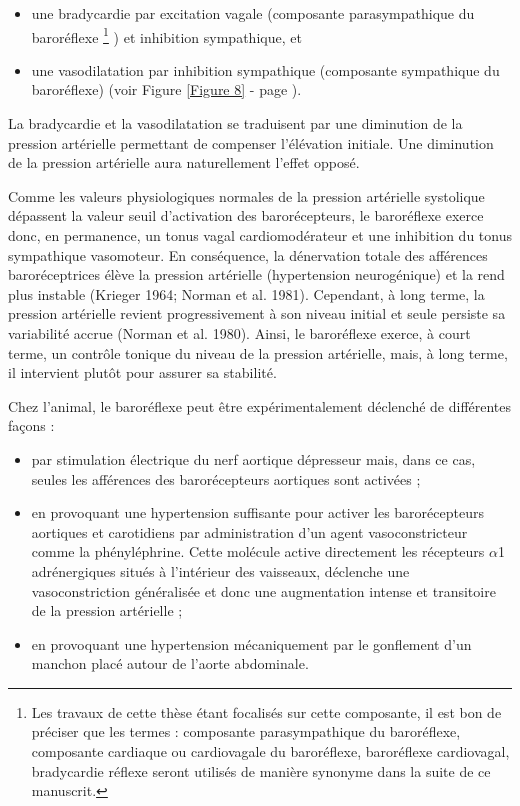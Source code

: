 \documentclass[a4paper,12pt,twoside]{report}
\begin{document}
\begin{itemize}
\item une bradycardie par excitation vagale (composante parasympathique du baroréflexe
\footnote{Les travaux de cette thèse étant focalisés sur cette composante, il est bon de préciser que les termes : composante parasympathique du baroréflexe, composante cardiaque ou cardiovagale du baroréflexe, baroréflexe cardiovagal, bradycardie réflexe seront utilisés de manière synonyme dans la suite de ce manuscrit.}
) et inhibition sympathique, et
\item une vasodilatation par inhibition sympathique (composante sympathique du baroréflexe) (voir Figure \ref{Figure 8} - page \pageref{Figure 8}).
\end{itemize}

La bradycardie et la vasodilatation se traduisent par une diminution de la pression artérielle permettant de compenser l’élévation initiale. Une diminution de la pression artérielle aura naturellement l'effet opposé. 

Comme les valeurs physiologiques normales de la pression artérielle systolique dépassent la valeur seuil d’activation des barorécepteurs, le baroréflexe exerce donc, en permanence, un tonus vagal cardiomodérateur et une inhibition du tonus sympathique vasomoteur. En conséquence, la dénervation totale des afférences baroréceptrices élève la pression artérielle (hypertension neurogénique) et la rend plus instable (Krieger 1964; Norman et al. 1981). Cependant, à long terme, la pression artérielle revient progressivement à son niveau initial et seule persiste sa variabilité accrue (Norman et al. 1980). Ainsi, le baroréflexe exerce, à court terme, un contrôle tonique du niveau de la pression artérielle, mais, à long terme, il intervient plutôt pour assurer sa stabilité.

Chez l’animal, le baroréflexe peut être expérimentalement déclenché de différentes façons : 

\begin{itemize}
\item par stimulation électrique du nerf aortique dépresseur mais, dans ce cas, seules les afférences des barorécepteurs aortiques sont activées ;
\item en provoquant une hypertension suffisante pour activer les barorécepteurs aortiques et carotidiens par administration d’un agent vasoconstricteur comme la phényléphrine. Cette molécule active directement les récepteurs $\alpha$1 adrénergiques situés à l’intérieur des vaisseaux, déclenche une vasoconstriction généralisée et donc une augmentation intense et transitoire de la pression artérielle ;
\item en provoquant une hypertension mécaniquement par le gonflement d’un manchon placé autour de l’aorte abdominale. \end{itemize}
\end{document}
